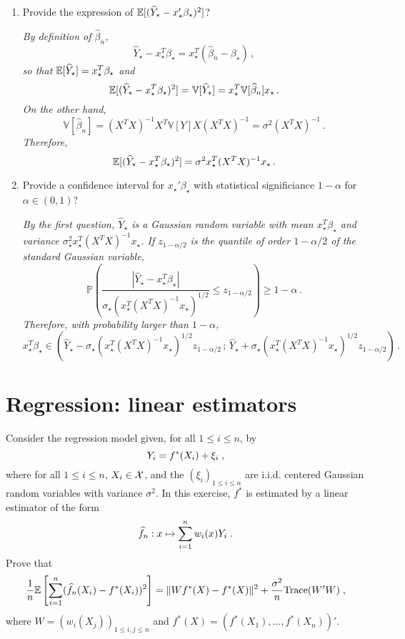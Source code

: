 \begin{enumerate}
\item  Provide the expression of $\mathbb{E}[(\widehat Y_\star - x_\star'\beta_\star)^2]$?

\vspace{.2cm}

{\em
By definition of $\widehat \beta_n $,
$$
\widehat Y_\star - x_\star^T\beta_\star = x_\star^T (\widehat\beta_n - \beta_\star)\,,
$$
so that $\mathbb{E}[\widehat Y_\star] =  x_\star^T\beta_\star$ and
$$
\mathbb{E}[(\widehat Y_\star - x_\star^T\beta_\star)^2] = \mathbb{V}[\widehat Y_\star] = x_\star^T \mathbb{V}[\widehat\beta_n]x_\star\,.
$$
On the other hand,
$$
\mathbb{V}[\widehat\beta_n] = (X^TX)^{-1}X^T \mathbb{V}[Y] X(X^TX)^{-1} = \sigma^2(X^TX)^{-1}\,.
$$
Therefore,
$$
\mathbb{E}[(\widehat Y_\star - x_\star^T\beta_\star)^2] = \sigma^2x_\star^T(X^TX)^{-1}x_\star\,.
$$
}

\item  Provide a confidence interval for $x_\star'\beta_\star$ with statistical significiance $1-\alpha$ for $\alpha\in(0,1)$?

\vspace{.2cm}

{\em
By the first question, $\widehat Y_\star$ is a Gaussian random variable with mean $x_\star^T\beta_\star$ and variance $\sigma_\star^2x_\star^T(X^TX)^{-1}x_\star$. If $z_{1-\alpha/2}$ is the quantile of order $1-\alpha/2$ of the standard Gaussian variable,
$$
\mathbb{P}\left(\frac{\left|\widehat Y_\star-x_\star^T\beta_\star\right|}{\sigma_\star(x_\star^T(X^TX)^{-1}x_\star)^{1/2}}\leqslant z_{1-\alpha/2}\right)\geqslant 1-\alpha\,.
$$
Therefore, with probability larger than $1-\alpha$,
$$
x_\star^T\beta_\star \in \left(\widehat Y_\star - \sigma_\star(x_\star^T(X^TX)^{-1}x_\star)^{1/2}z_{1-\alpha/2}\,;\, \widehat Y_\star + \sigma_\star(x_\star^T(X^TX)^{-1}x_\star)^{1/2}z_{1-\alpha/2}\right)\,.
$$
}
\end{enumerate}


\section{Regression: linear estimators}
Consider the regression model given, for all $1\leqslant i\leqslant n$, by
\[
Y_{i}=f^*(X_{i})+\xi_{i}\;,
\]
where for all $1\leqslant i\leqslant n$, $X_i\in\mathcal{X}$, and the $(\xi_{i})_{1\leqslant i \leqslant n}$ are i.i.d. centered Gaussian random variables with variance $\sigma^2$. In this exercise, $f^*$ is estimated by a linear estimator of the form
\[
\widehat f_n: x \mapsto \sum_{i = 1}^n w_i(x)Y_i\;.
\]
Prove that
\[
\frac{1}{n}\mathbb{E}\left[\sum_{i=1}^n(\widehat f_n(X_i) - f^*(X_i))^2\right] = \|Wf^*(X) - f^*(X)\|^2 + \frac{\sigma^2}{n}\mathrm{Trace}(W'W)\;, 
\]
where $W = (w_i(X_j))_{1\leqslant i,j \leqslant n}$ and $f^*(X) = (f^*(X_1),\ldots,f^*(X_n))'$.

